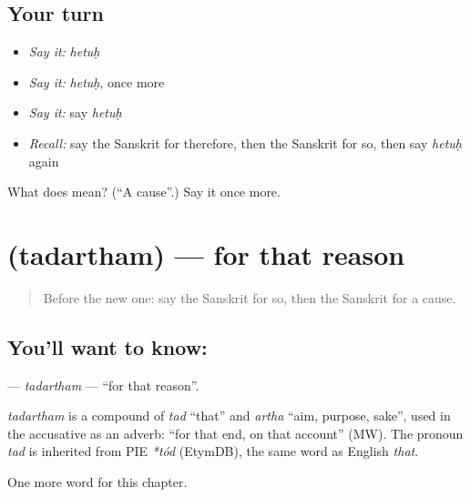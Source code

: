 \subsection*{Your turn}
\begin{itemize}
\raggedright
  \item \emph{Say it:} \emph{hetuḥ}
  \item \emph{Say it:} \emph{hetuḥ}, once more
  \item \emph{Say it:} say \emph{hetuḥ}
  \item \emph{Recall:} say the Sanskrit for therefore, then the Sanskrit for so, then say \emph{hetuḥ} again
\end{itemize}

\begin{tcolorbox}[breakable,colback=teal!4,colframe=teal!35!black,title={Before you move on}]
What does  mean? (\textquotedblleft{}A cause\textquotedblright{}.) Say it once more.
\end{tcolorbox}
\section[\texorpdfstring{\sk{तदर्थम्} (tadartham)}{तदर्थम् (tadartham)}]{ (tadartham) — for that reason}

\label{lesson:SA-C98-tadartham}



\begin{quote}
Before the new one: say the Sanskrit for so, then the Sanskrit for a cause.
\end{quote}

\subsection*{You'll want to know: }
\textbf{} — \emph{tadartham} — \textquotedblleft{}for that reason\textquotedblright{}.

\begin{cousinweb}
\emph{tadartham} is a compound of \emph{tad} \textquotedblleft{}that\textquotedblright{} and \emph{artha} \textquotedblleft{}aim, purpose, sake\textquotedblright{}, used in the accusative as an adverb: \textquotedblleft{}for that end, on that account\textquotedblright{} (MW). The pronoun \emph{tad} is inherited from PIE \emph{*tód} (EtymDB), the same word as English \emph{that}.
\end{cousinweb}

\begin{grammarlens}[title={What you've built}]
One more word for this chapter.
\end{grammarlens}

